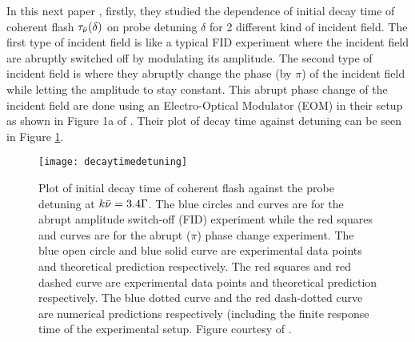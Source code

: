 In this next paper \cite{Kwong2015}, firstly, they studied the dependence of initial decay time of coherent flash $\tau_{\Bar{\nu}}(\delta)$ on probe detuning $\delta$ for 2 different kind of incident field. The first type of incident field is like a typical FID experiment where the incident field are abruptly switched off by modulating its amplitude. The second type of incident field is where they abruptly change the phase (by $\pi$) of the incident field  while letting the amplitude to stay constant. This abrupt phase change of the incident field are done using an Electro-Optical Modulator (EOM) in their setup as shown in Figure 1a of \cite{Kwong2015}. Their plot of decay time against detuning can be seen in Figure \ref{fig: decaytimedetuning}.

\begin{figure}[h!]
    \centering
    \texttt{[image: decaytimedetuning]}
    \caption{Plot of initial decay time of coherent flash against the probe detuning at $k \Bar{\nu} = 3.4\Gamma$. The blue circles and curves are for the abrupt amplitude switch-off (FID) experiment while the red squares and curves are for the abrupt ($\pi$) phase change experiment. The blue open circle and blue solid curve are experimental data points and theoretical prediction respectively. The red squares and red dashed curve are experimental data points and theoretical prediction respectively. The blue dotted curve and the red dash-dotted curve are numerical predictions respectively (including the finite response time of the experimental setup. Figure courtesy of \cite{Kwong2015}.}
    \label{fig: decaytimedetuning}
\end{figure}

\newpage

